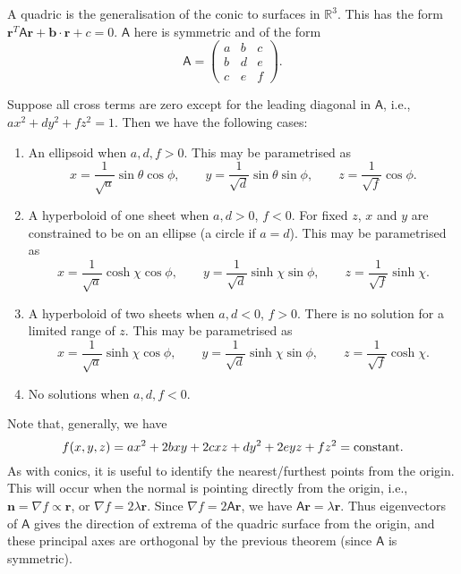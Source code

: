 \documentclass[10pt,notitlepage]{revtex4-1}
\newenvironment{example}[1][Example]{\begin{trivlist}
\item[\hskip \labelsep {\bfseries #1}]}{\end{trivlist}}
\newcommand{\grad}{\nabla}
\newcommand{\bb}{{\boldsymbol{b}}}
\newcommand{\nb}{{\boldsymbol{n}}}
\begin{document}
A quadric is the generalisation of the conic to surfaces in $\mathbb{R}^3$. This
has the form $\boldsymbol{r}^T\mathsf{A}\boldsymbol{r}+\bb\cdot\boldsymbol{r} +
c=0$. $\mathsf{A}$ here is symmetric and of the form
\begin{equation}
	\mathsf{A}=\begin{pmatrix}a&b&c\\b&d&e\\c&e&f\end{pmatrix}.
\end{equation}
\begin{example}
	Suppose all cross terms are zero except for the leading diagonal in
	$\mathsf{A}$, i.e., $ax^2+dy^2+fz^2=1$. Then we have the following cases:
	\begin{enumerate}
		\item An ellipsoid when $a,d,f>0$. This may be parametrised as
		\begin{equation}
			x=\frac{1}{\sqrt{a}}\sin\theta\cos\phi,\qquad
			y=\frac{1}{\sqrt{d}}\sin\theta\sin\phi,\qquad
			z=\frac{1}{\sqrt{f}}\cos\phi.
		\end{equation}
		\item A hyperboloid of one sheet when $a,d>0$, $f<0$. For fixed $z$, $x$
		and $y$ are constrained to be on an ellipse (a circle if $a=d$). This
		may be parametrised as
		\begin{equation}
			x=\frac{1}{\sqrt{a}}\cosh\chi\cos\phi,\qquad
			y=\frac{1}{\sqrt{d}}\sinh\chi\sin\phi,\qquad
			z=\frac{1}{\sqrt{f}}\sinh\chi.
		\end{equation}
		\item A hyperboloid of two sheets when $a,d<0$, $f>0$. There is no
		solution for a limited range of $z$. This may be parametrised as
		\begin{equation}
			x=\frac{1}{\sqrt{a}}\sinh\chi\cos\phi,\qquad
			y=\frac{1}{\sqrt{d}}\sinh\chi\sin\phi,\qquad
			z=\frac{1}{\sqrt{f}}\cosh\chi.
		\end{equation}
		\item No solutions when $a,d,f<0$.
	\end{enumerate}
\end{example}

Note that, generally, we have
\begin{equation}
	f(x,y,z)=ax^2+2bxy+2cxz+dy^2+2eyz+fz^2 = \textnormal{constant}.
\end{equation}
As with conics, it is useful to identify the nearest/furthest points from the
origin. This will occur when the normal is pointing directly from the origin,
i.e., $\nb=\grad f\propto\boldsymbol{r}$, or $\grad f=2\lambda\boldsymbol{r}$.
Since $\grad f=2\mathsf{A}\boldsymbol{r}$, we have $\mathsf{A}\boldsymbol{r} =
\lambda\boldsymbol{r}$. Thus eigenvectors of $\mathsf{A}$ gives the direction of
extrema of the quadric surface from the origin, and these principal axes are
orthogonal by the previous theorem (since $\mathsf{A}$ is symmetric).
\end{document}
